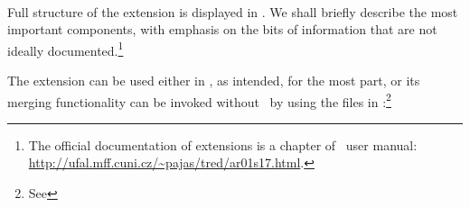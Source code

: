 \todo\ 

Full structure of the extension is displayed in . We shall briefly describe the most important components, with emphasis on the bits of information that are not ideally documented.\footnote{The official documentation of extensions is a chapter of \tred\ user manual: \url{http://ufal.mff.cuni.cz/~pajas/tred/ar01s17.html}.}

The extension can be used either in \tred, as intended, for the most part, or its merging functionality can be invoked without \tred\ by using the files in :\footnote{See }

